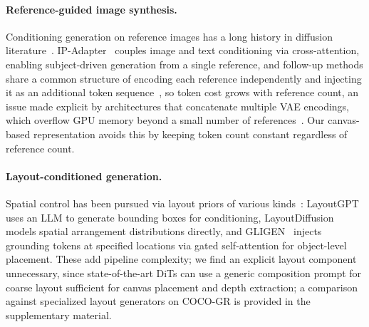 \documentclass[runningheads]{llncs}
\begin{document}
\paragraph{Reference-guided image synthesis.}
Conditioning generation on reference images has a long history in diffusion literature~\cite{zhang2023adding,xverse2024,xiang2025instanceassemble,he2025dreamo,tang2024creatilayout,kumari2023multiconcept,ruiz2023dreambooth}.
IP-Adapter~\cite{ye2023ip} couples image and text conditioning via cross-attention, enabling subject-driven generation from a single reference, and follow-up methods share a common structure of encoding each reference independently and injecting it as an additional token sequence~\cite{wang2024instantid, li2024photomaker, ruiz2023dreambooth, kumari2023multiconcept}, so token cost grows with reference count, an issue made explicit by architectures that concatenate multiple VAE encodings, which overflow GPU memory beyond a small number of references~\cite{ye2023ip, wang2024msdiffusion, wu2025uno, xverse2024, xiao2024omnigen, omnigen2_2025}.
Our canvas-based representation avoids this by keeping token count constant regardless of reference count.

\paragraph{Layout-conditioned generation.}
Spatial control has been pursued via layout priors of various kinds~\cite{zhang2023adding, li2023gligen, feng2023layoutgpt, lian2023layoutdiffusion, zheng2023layoutdiffusion, tang2024creatilayout, xiang2025instanceassemble}: LayoutGPT~\cite{feng2023layoutgpt} uses an LLM to generate bounding boxes for conditioning, LayoutDiffusion~\cite{zheng2023layoutdiffusion} models spatial arrangement distributions directly, and GLIGEN~\cite{li2023gligen} injects grounding tokens at specified locations via gated self-attention for object-level placement.
These add pipeline complexity; we find an explicit layout component unnecessary, since state-of-the-art DiTs can use a generic composition prompt for coarse layout sufficient for canvas placement and depth extraction; a comparison against specialized layout generators on COCO-GR is provided in the supplementary material.
\end{document}
